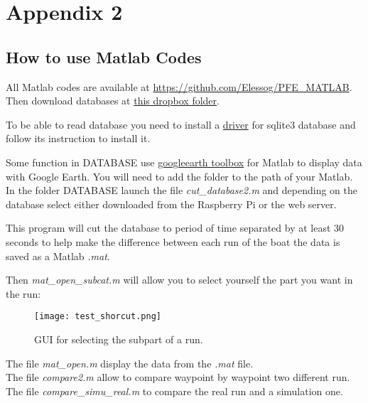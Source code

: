 \documentclass[twoside,12pt]{report} %
\begin{document}
\chapter*{Appendix 2}
\section*{How to use Matlab Codes}

All Matlab codes are available at  \href{https://github.com/Elessog/PFE\_MATLAB}{https://github.com/Elessog/PFE\_MATLAB}.\\

Then download databases at  \href{https://www.dropbox.com/sh/rxi1qrw2skyffge/AAAyLwLvpsNwcxGQiaa66Mcda?dl=0}{this dropbox folder}.

To be able to read database you need to install a \href{https://github.com/kyamagu/matlab-sqlite3-driver}{driver} for sqlite3 database and follow its instruction to install it.

Some function in DATABASE use \href{https://code.google.com/archive/p/googleearthtoolbox/}{googleearth toolbox} for Matlab to display data with Google Earth. You will need to add the folder to the path of your Matlab.\\
In the folder DATABASE launch the file \textit{cut\_database2.m} and depending on the database select either
downloaded from the Raspberry Pi or the web server. 

This program will cut the database to period of time separated by at least 30 seconds to help make the difference between each run of the boat the data is saved as a Matlab \textit{.mat}.

Then \textit{mat\_open\_subcat.m} will allow you to select yourself the part you want in the run:

\begin{figure}[H]
\centering
    \texttt{[image: test\_shorcut.png]}
    \caption*{GUI for selecting the subpart of a run.}
    \label{fig:test_shorcut}
\end{figure}

The file \textit{mat\_open.m} display the data from the \textit{.mat} file.\\
The file \textit{compare2.m} allow to compare waypoint by waypoint two different run.\\
The file \textit{compare\_simu\_real.m} to compare the real run and a simulation one.\\
\end{document}
